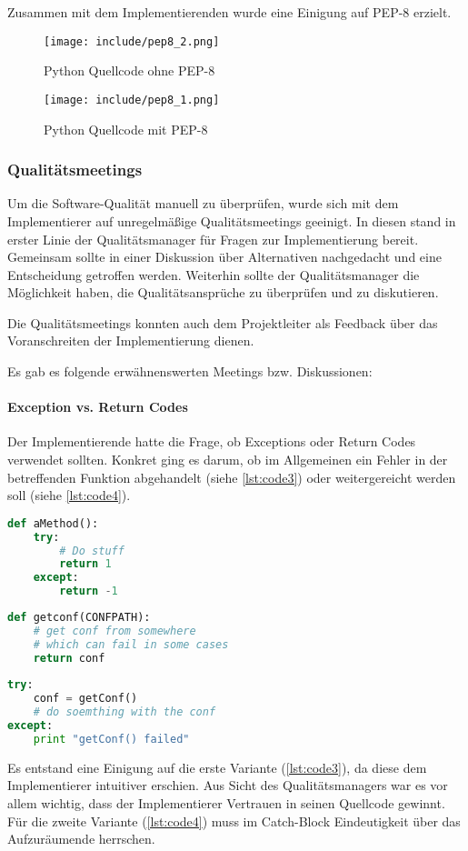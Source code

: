 Zusammen mit dem Implementierenden wurde eine Einigung auf PEP-8 erzielt.
\begin{figure}[!ht]
\centering
\texttt{[image: include/pep8\_2.png]}
\caption{Python Quellcode ohne PEP-8}
\label{fig:pep82}
\end{figure}
\begin{figure}[!ht]
\centering
\texttt{[image: include/pep8\_1.png]}
\caption{Python Quellcode mit PEP-8}
\label{fig:pep81}
\end{figure}
\subsubsection{Qualitätsmeetings}
Um die Software-Qualität manuell zu überprüfen, wurde sich mit dem Implementierer auf unregelmäßige Qualitätsmeetings geeinigt. In diesen stand in erster Linie der Qualitätsmanager für Fragen zur Implementierung bereit. Gemeinsam sollte in einer Diskussion über Alternativen nachgedacht und eine Entscheidung getroffen werden. Weiterhin sollte der Qualitätsmanager die Möglichkeit haben, die Qualitätsansprüche zu überprüfen und zu diskutieren.

Die Qualitätsmeetings konnten auch dem Projektleiter als Feedback über das Voranschreiten der Implementierung dienen.

Es gab es folgende erwähnenswerten Meetings bzw. Diskussionen:
\paragraph{Exception vs. Return Codes}
Der Implementierende hatte die Frage, ob Exceptions oder Return Codes verwendet sollten.
Konkret ging es darum, ob im Allgemeinen ein Fehler in der betreffenden Funktion abgehandelt (siehe \autoref{lst:code3}) oder weitergereicht werden soll (siehe \autoref{lst:code4}).
\begin{lstlisting}[language=python,caption={Returncodes verwenden},label={lst:code3}]
def aMethod():
    try:
        # Do stuff
        return 1
    except:
        return -1
\end{lstlisting}
\begin{lstlisting}[language=python,caption={Durch Exception nach oben eskalieren},label={lst:code4}]
def getconf(CONFPATH):
    # get conf from somewhere
    # which can fail in some cases
    return conf
    
try:
    conf = getConf()       
    # do soemthing with the conf
except:
    print "getConf() failed"        
\end{lstlisting}
Es entstand eine Einigung auf die erste Variante (\autoref{lst:code3}), da diese dem Implementierer intuitiver erschien. Aus Sicht des Qualitätsmanagers war es vor allem wichtig, dass der Implementierer Vertrauen in seinen Quellcode gewinnt.%
Für die zweite Variante (\autoref{lst:code4}) muss im Catch-Block Eindeutigkeit über das Aufzuräumende herrschen.
